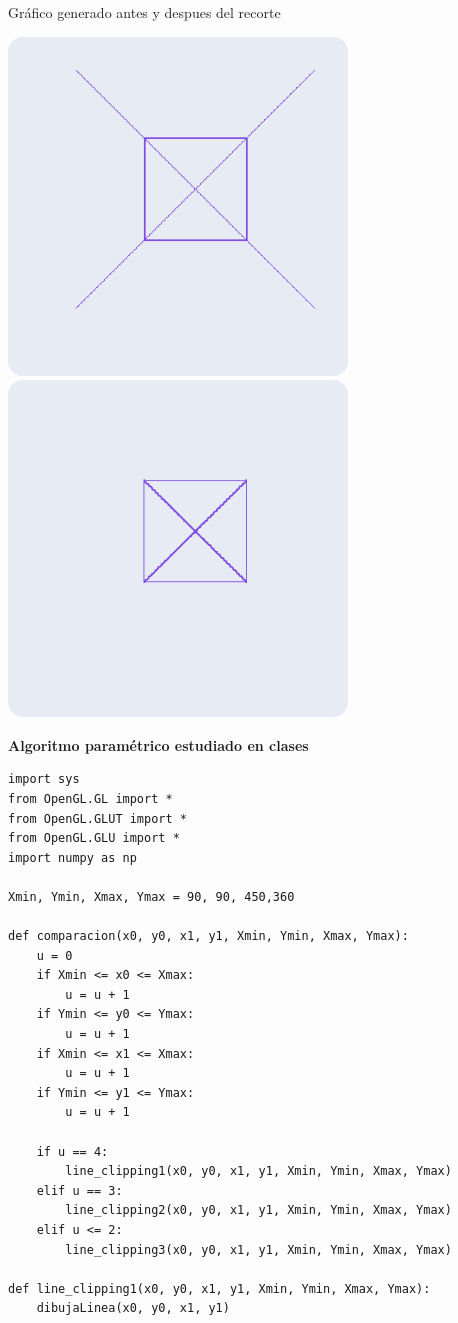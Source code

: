 \documentclass[a4paper]{article}
\begin{document}
Gráfico generado antes y despues del recorte
\begin{center}
\includegraphics[width=9cm]{src/cohen1.png}
\includegraphics[width=9cm]{src/cohen2.png}
\end{center}
\newpage

\Large{\textbf{Algoritmo paramétrico estudiado en clases}}\\[-0.5cm]
\begin{center}
\begin{mycodebox}
\begin{lstlisting}
import sys
from OpenGL.GL import *
from OpenGL.GLUT import *
from OpenGL.GLU import *
import numpy as np

Xmin, Ymin, Xmax, Ymax = 90, 90, 450,360

def comparacion(x0, y0, x1, y1, Xmin, Ymin, Xmax, Ymax):
    u = 0
    if Xmin <= x0 <= Xmax:
        u = u + 1
    if Ymin <= y0 <= Ymax:
        u = u + 1
    if Xmin <= x1 <= Xmax:
        u = u + 1
    if Ymin <= y1 <= Ymax:
        u = u + 1

    if u == 4:
        line_clipping1(x0, y0, x1, y1, Xmin, Ymin, Xmax, Ymax)
    elif u == 3:
        line_clipping2(x0, y0, x1, y1, Xmin, Ymin, Xmax, Ymax)
    elif u <= 2:
        line_clipping3(x0, y0, x1, y1, Xmin, Ymin, Xmax, Ymax)

def line_clipping1(x0, y0, x1, y1, Xmin, Ymin, Xmax, Ymax):
    dibujaLinea(x0, y0, x1, y1)
\end{lstlisting}
\end{mycodebox}
\end{center}
\newpage
\end{document}
